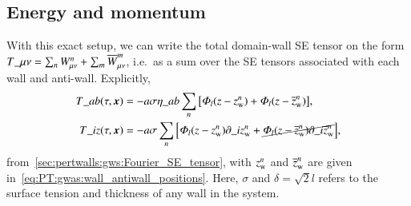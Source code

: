 \subsection{Energy and momentum}\label{sec:PT:gwas:SE_tensor}
    With this exact setup, we can write the total domain-wall SE tensor on the form %
    $T\_{\mu\nu}= \sum_{n}{W^n_{\mu\nu}} + \sum_m {\overline{W}^{m}_{\mu\nu}} $, 
    i.e.~as a sum over the SE tensors associated with each wall and anti-wall. Explicitly,
    \begin{equation} 
        \begin{split}
            T\_{ab}(\tau, \boldsymbol{x}) &= -a \sigma \eta\_{ab} \sum_{n} {\left[ \varPhi_{l}(z-z_\mathrm{w}^n)+ \varPhi_{l}(z-\overline{z}_\mathrm{w}^n)  \right]},  \\
            T\_{iz}(\tau, \boldsymbol{x}) &= -a \sigma \sum_{n} {\left[ \varPhi_{l}(z-z_\mathrm{w}^n) \partial\_i z_\mathrm{w}^n + \cancel{ \varPhi_{l}(z-\overline{z}_\mathrm{w}^n) \partial\_i \overline{z}_\mathrm{w}^n}  \right]},
        \end{split}
    \end{equation}
    from~\cref{sec:pertwalls:gws:Fourier_SE_tensor}, with $z_\mathrm{w}^n$ and $\overline{z}_\mathrm{w}^n$ are given in~\cref{eq:PT:gwas:wall_antiwall_positions}. Here, $\sigma$ and $\delta=\sqrt{2}l$ refers to the surface tension and thickness of any wall in the system.

